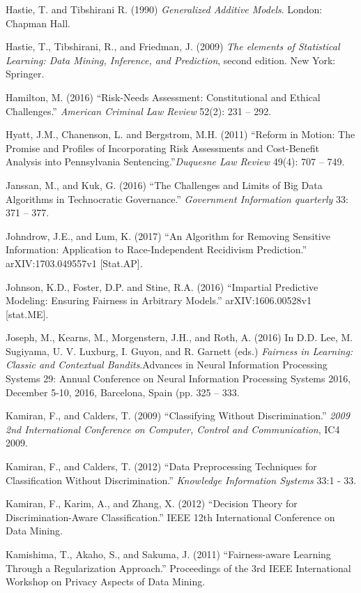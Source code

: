\documentclass[12pt]{article}
\begin{document}
\begin{description}
\item
Hastie, T. and Tibshirani R. (1990) \textit{Generalized Additive Models}. London: Chapman Hall. 
\item
Hastie, T., Tibshirani, R., and Friedman, J. (2009) \textit{The elements of Statistical Learning: Data Mining, Inference, and Prediction}, second edition. New York: Springer.
\item
Hamilton, M. (2016) ``Risk-Needs Assessment: Constitutional and Ethical Challenges.'' \textit{American Criminal Law Review} 52(2): 231 -- 292. 
\item
Hyatt, J.M., Chanenson, L. and Bergstrom, M.H. (2011) ``Reform in Motion: The Promise and Profiles of Incorporating Risk Assessments and Cost-Benefit Analysis into Pennsylvania Sentencing.''\textit{Duquesne Law Review} 49(4): 707 -- 749.
\item
Janssan, M., and Kuk, G. (2016) ``The Challenges and Limits of Big Data Algorithms in Technocratic Governance.'' \textit{Government Information quarterly} 33: 371 -- 377.
\item
Johndrow, J.E., and Lum, K. (2017) ``An Algorithm for Removing Sensitive Information: Application to Race-Independent Recidivism Prediction.'' arXIV:1703.049557v1 [Stat.AP].
\item
Johnson, K.D., Foster, D.P. and Stine, R.A. (2016) ``Impartial Predictive Modeling: Ensuring Fairness in Arbitrary Models.'' arXIV:1606.00528v1 [stat.ME]. 
\item
Joseph, M., Kearns, M., Morgenstern, J.H., and Roth, A. (2016) In D.D. Lee, M. Sugiyama, U. V. Luxburg, I. Guyon, and R. Garnett (eds.) \textit{Fairness in Learning: Classic and Contextual Bandits}.Advances in Neural Information Processing Systems 29: Annual Conference on Neural Information Processing Systems 2016, December 5-10, 2016, Barcelona, Spain (pp. 325 -- 333.
\item
Kamiran, F., and Calders, T. (2009) ``Classifying Without Discrimination.'' \textit{2009 2nd International Conference on Computer, Control and Communication}, IC4 2009.
\item
Kamiran, F., and Calders, T. (2012) ``Data Preprocessing Techniques for Classification Without Discrimination.'' \textit{Knowledge Information Systems} 33:1 - 33.
\item
Kamiran, F., Karim, A., and Zhang, X. (2012) ``Decision Theory for Discrimination-Aware Classification.'' IEEE 12th International Conference on Data Mining.
\item
Kamishima, T., Akaho, S., and Sakuma, J. (2011) ``Fairness-aware Learning Through a Regularization Approach.'' Proceedings of the 3rd IEEE International Workshop on Privacy Aspects of Data Mining.

\end{description}
\end{document}
